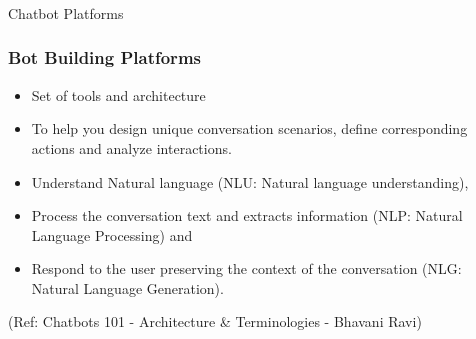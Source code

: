 \begin{frame}[fragile]\frametitle{}
\begin{center}
{\Large Chatbot Platforms}
\end{center}
\end{frame}

 \begin{frame}[fragile]\frametitle{Bot Building Platforms}
\begin{itemize}
\item Set of tools and architecture
\item To help you design unique conversation scenarios, define corresponding actions and analyze interactions.
\item Understand Natural language (NLU: Natural language understanding), 
\item Process the conversation text and extracts information (NLP: Natural Language Processing) and \item Respond to the user preserving the context of the conversation (NLG: Natural Language Generation).
\end{itemize}

{\tiny (Ref: Chatbots 101 - Architecture \& Terminologies -  Bhavani Ravi)}

\end{frame}








